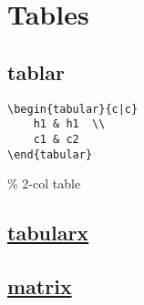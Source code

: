 \section{Tables}


\subsection*{tablar}

\begin{code}{}
\begin{lstlisting}
\begin{tabular}{c|c}
    h1 & h1  \\
    c1 & c2 
\end{tabular}
\end{lstlisting}\end{code}
\% 2-col table \\


\subsection*{\href{http://mirrors.ctan.org/macros/latex/required/tools/tabularx.pdf}{tabularx}}

\subsection*{\href{https://www.overleaf.com/learn/latex/Matrices}{matrix}}

\ \\